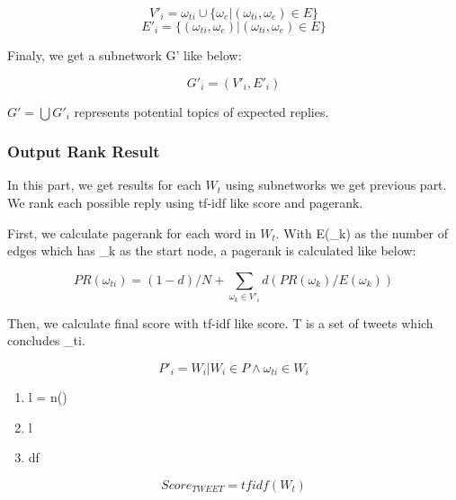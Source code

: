 \documentclass{sig-alternate}
\begin{document}
\[V'_{i} = \omega_{ti} \cup \{\omega_{e} |  (\omega_{ti}, \omega_{e}) \in E\}\]
\[E'_{i} = \{(\omega_{ti}, \omega_{e}) | (\omega_{ti}, \omega_{e}) \in E\} \]

Finaly, we get a subnetwork G' like below:

\[G'_{i} = (V'_{i}, E'_{i})\]

\(G' = \bigcup G'_{i}\) represents potential topics of expected replies.

\subsubsection{Output Rank Result}
In this part, we get results for each $W_{t}$ using subnetworks we get previous part. We rank each possible reply using tf-idf like score and pagerank.

First, we calculate pagerank for each word in $W_{t}$. With E(\omega_{k}) as the number of edges which has \omega_{k} as the start node, a pagerank is calculated like below:

\[PR(\omega_{ti}) = (1-d)/N + \sum_{\omega_{k}\in V'_{i}} d(PR(\omega_{k})/E(\omega_{k}))\]

Then, we calculate final score with tf-idf like score. T is a set of tweets which concludes \omega_{ti}. 

\[P'_{i} = {W_{i} | W_{i} \in P \wedge \omega_{ti} \in W_{i}}\]

\begin{enumerate}
    \item l = n()
    \item l
    \item df
\end{enumerate}

\[Score_{TWEET} = tfidf(W_{t})\]




\end{document}
